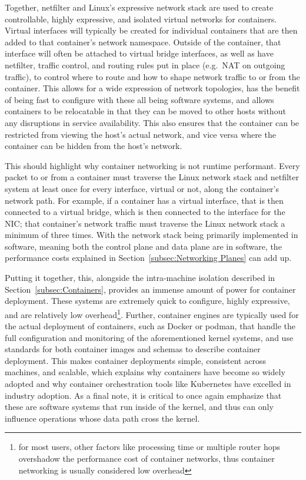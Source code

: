 \documentclass[12pt,titlepage]{article}
\begin{document}
Together, netfilter and Linux's expressive network stack are used to create controllable, highly expressive, and isolated virtual networks for containers.
Virtual interfaces will typically be created for individual containers that are then added to that container's network namespace.
Outside of the container, that interface will often be attached to virtual bridge interfaces, as well as have netfilter, traffic control, and routing rules put in place (e.g.\ NAT on outgoing traffic), to control where to route and how to shape network traffic to or from the container.
This allows for a wide expression of network topologies, has the benefit of being fast to configure with these all being software systems, and allows containers to be relocatable in that they can be moved to other hosts without any disruptions in service availability.
This also ensures that the container can be restricted from viewing the host's actual network, and vice versa where the container can be hidden from the host's network.

This should highlight why container networking is not runtime performant.
Every packet to or from a container must traverse the Linux network stack and netfilter system at least once for every interface, virtual or not, along the container's network path.
For example, if a container has a virtual interface, that is then connected to a virtual bridge, which is then connected to the interface for the NIC\@; that container's network traffic must traverse the Linux network stack a minimum of three times.
With the network stack being primarily implemented in software, meaning both the control plane and data plane are in software, the performance costs explained in Section~\ref{subsec:Networking Planes} can add up.

Putting it together, this, alongside the intra-machine isolation described in Section~\ref{subsec:Containers}, provides an immense amount of power for container deployment.
These systems are extremely quick to configure, highly expressive, and are relatively low overhead\footnote{for most users, other factors like processing time or multiple router hops overshadow the performance cost of container networks, thus container networking is usually considered low overhead}.
Further, container engines are typically used for the actual deployment of containers, such as Docker or podman, that handle the full configuration and monitoring of the aforementioned kernel systems, and use standards for both container images and schemas to describe container deployment.
This makes container deployments simple, consistent across machines, and scalable, which explains why containers have become so widely adopted and why container orchestration tools like Kubernetes have excelled in industry adoption.
As a final note, it is critical to once again emphasize that these are software systems that run inside of the kernel, and thus can only influence operations whose data path cross the kernel.
\end{document}
